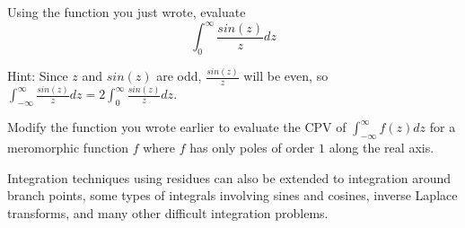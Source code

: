 \begin{problem}
Using the function you just wrote, evaluate
$$\int_{0}^{\infty} \frac{sin(z)}{z} dz$$

Hint: Since $z$ and $sin(z)$ are odd, $\frac{sin(z)}{z}$ will be even, so 
$\int_{-\infty}^{\infty} \frac{sin(z)}{z} dz = 2 \int_{0}^{\infty} \frac{sin(z)}{z} dz$.
\end{problem}


\begin{problem}
Modify the function you wrote earlier to evaluate the CPV of $\int_{-\infty}^{\infty} f(z) dz$ for a meromorphic function $f$ where $f$ has only poles of order $1$ along the real axis.
\end{problem}

Integration techniques using residues can also be extended to integration around branch points, some types of integrals involving sines and cosines, inverse Laplace transforms, and many other difficult integration problems.